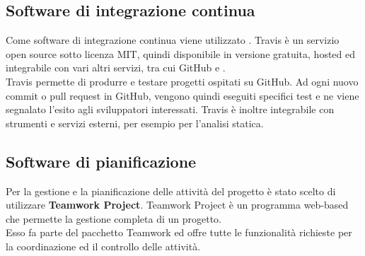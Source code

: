 \subsection{Software di integrazione continua}
Come software di integrazione continua viene utilizzato \textbf{}.
Travis è un servizio open source sotto licenza MIT, quindi disponibile in versione gratuita, hosted ed integrabile con vari altri servizi, tra cui GitHub e .\\ Travis permette di produrre e testare progetti ospitati su GitHub. Ad ogni nuovo commit o pull request in GitHub, vengono quindi eseguiti specifici test e ne viene segnalato l'esito agli sviluppatori interessati. Travis è inoltre integrabile con strumenti e servizi esterni, per esempio per l'analisi statica.

\subsection{Software di pianificazione} \label{sec:teamwork}
Per la gestione e la pianificazione delle attività del progetto è stato scelto di utilizzare \textbf{Teamwork Project}. Teamwork Project è un programma web-based che permette la gestione completa di un progetto.\\
Esso fa parte del pacchetto Teamwork ed offre tutte le funzionalità richieste per la coordinazione ed il controllo delle attività.
